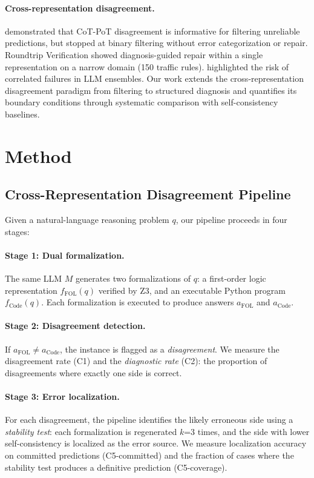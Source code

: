 \documentclass[11pt]{article}
\begin{document}
\paragraph{Cross-representation disagreement.} \citet{liang2024filtering} demonstrated that CoT-PoT disagreement is informative for filtering unreliable predictions, but stopped at binary filtering without error categorization or repair. Roundtrip Verification \citep{roundtrip2026} showed diagnosis-guided repair within a single representation on a narrow domain (150 traffic rules). \citet{denisov2026correlated} highlighted the risk of correlated failures in LLM ensembles. Our work extends the cross-representation disagreement paradigm from filtering to structured diagnosis and quantifies its boundary conditions through systematic comparison with self-consistency baselines.

\section{Method}

\subsection{Cross-Representation Disagreement Pipeline}

Given a natural-language reasoning problem $q$, our pipeline proceeds in four stages:

\paragraph{Stage 1: Dual formalization.} The same LLM $M$ generates two formalizations of $q$: a first-order logic representation $f_{\text{FOL}}(q)$ verified by Z3, and an executable Python program $f_{\text{Code}}(q)$. Each formalization is executed to produce answers $a_{\text{FOL}}$ and $a_{\text{Code}}$.

\paragraph{Stage 2: Disagreement detection.} If $a_{\text{FOL}} \neq a_{\text{Code}}$, the instance is flagged as a \emph{disagreement}. We measure the disagreement rate (C1) and the \emph{diagnostic rate} (C2): the proportion of disagreements where exactly one side is correct.

\paragraph{Stage 3: Error localization.} For each disagreement, the pipeline identifies the likely erroneous side using a \emph{stability test}: each formalization is regenerated $k$=3 times, and the side with lower self-consistency is localized as the error source. We measure localization accuracy on committed predictions (C5-committed) and the fraction of cases where the stability test produces a definitive prediction (C5-coverage).
\end{document}
